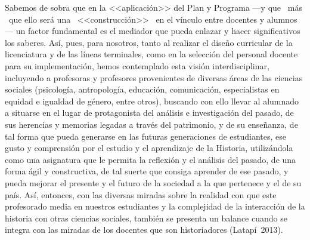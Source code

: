 \enlargethispage{1\baselineskip}
Sabemos de sobra que en la <<aplicación>>  del Plan  y  Programa ---y que \ más \
que  ello será  una \ <<construcción>> \ en el vínculo entre docentes y alumnos--- un 
factor fundamental es el mediador que pueda enlazar y hacer 
significativos los saberes.  Así, pues, para nosotros, tanto al realizar 
el diseño curricular de la licenciatura y de las líneas terminales, 
como en la selección del personal docente para su implementación, hemos 
contemplado esta visión interdisciplinar, incluyendo a profesoras y 
profesores provenientes de diversas áreas de las ciencias sociales 
(psicología, antropología, educación,  comunicación, especialistas 
en equidad e igualdad de género, entre otros), buscando con ello llevar 
al alumnado a situarse en el lugar de protagonista del análisis e 
investigación del pasado, de sus herencias y memorias legadas a través 
del patrimonio, y de su enseñanza, de tal forma que pueda generarse en 
las futuras generaciones de estudiantes, ese gusto y comprensión por el 
estudio y el aprendizaje de la Historia, utilizándola como una asignatura 
que le permita la reflexión y el análisis del pasado, de una forma ágil y 
constructiva, de tal suerte que consiga aprender de ese pasado, y pueda 
mejorar el presente y el futuro de la sociedad a la que pertenece y el de 
su país. Así, entonces, con las 
diversas miradas sobre la realidad con que este profesorado media en nuestros 
estudiantes  y la complejidad de la interacción de la historia con 
otras ciencias sociales, también se presenta un balance cuando se integra con 
las miradas de los docentes que son historiadores (Latapí~2013). 

